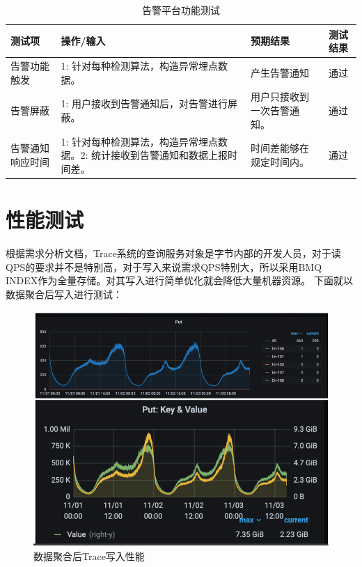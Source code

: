 \begin{longtable}[htbp]
\begin{table}[h]  
\centering  
\caption{告警平台功能测试}
\begin{tabular}{|l|p{4cm}|p{3cm}|l|}  
\hline  
\textbf{测试项} & \textbf{操作/输入} & \textbf{预期结果} & \textbf{测试结果} \\ \hline  
告警功能触发 & 1: 针对每种检测算法，构造异常埋点数据。 & 产生告警通知 & 通过 \\ \hline  
告警屏蔽 & 1: 用户接收到告警通知后，对告警进行屏蔽。 & 用户只接收到一次告警通知。 & 通过 \\ \hline  
告警通知响应时间 & 1: 针对每种检测算法，构造异常埋点数据。2: 统计接收到告警通知和数据上报时间差。 & 时间差能够在规定时间内。 & 通过 \\ \hline 
\end{tabular} 
\label{table:gaojingpingtaiTest}
\end{table}  

\section{性能测试}

根据需求分析文档，Trace系统的查询服务对象是字节内部的开发人员，对于读QPS的要求并不是特别高，对于写入来说需求QPS特别大，所以采用BMQ INDEX作为全量存储。对其写入进行简单优化就会降低大量机器资源。
下面就以数据聚合后写入进行测试：

\begin{figure}[htbp]
  \centering
  \includegraphics[width=5in]{figure/chapter6/数据聚合后Trace写入性能.png}
  \caption{数据聚合后Trace写入性能}\label{shujujuheTest}
\end{figure}


\end{longtable}
